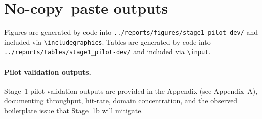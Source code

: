 
\section*{No-copy--paste outputs}
Figures are generated by code into \texttt{../reports/figures/stage1\_pilot-dev/} and included via \texttt{\textbackslash includegraphics}. Tables are generated by code into \texttt{../reports/tables/stage1\_pilot-dev/} and included via \texttt{\textbackslash input}.

\paragraph{Pilot validation outputs.}
Stage~1 pilot validation outputs are provided in the Appendix (see Appendix~A), documenting throughput, hit-rate, domain concentration, and the observed boilerplate issue that Stage~1b will mitigate.
